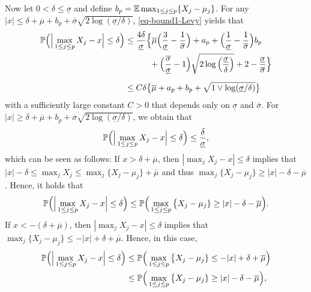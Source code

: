 \documentclass[a4paper,12pt]{article}
\begin{document}
Now let $0 < \delta \le \underline{\sigma}$ and define $b_p = \mathbb{E} \max_{1 \le j \le p} \{X_j - \mu_j\}$. For any $|x| \le \delta + \overline{\mu} + b_p + \overline{\sigma} \sqrt{2\log(\underline{\sigma}/\delta)}$, \eqref{eq-bound1-Levy} yields that 
\begin{align}
\pr \Big( \Big| \max_{1 \le j \le p} X_j - x \Big| \le \delta \Big) 
 & \le \frac{4 \delta}{\underline{\sigma}} \Big\{ \overline{\mu} \Big( \frac{3}{\underline{\sigma}} - \frac{1}{\overline{\sigma}} \Big) + a_p + \Big( \frac{1}{\underline{\sigma}} - \frac{1}{\overline{\sigma}} \Big) b_p \nonumber \\ & \phantom{\le \frac{4 \delta}{\underline{\sigma}} \Big\{} + \Big( \frac{\overline{\sigma}}{\underline{\sigma}} - 1 \Big) \sqrt{2\log\Big(\frac{\underline{\sigma}}{\delta}\Big)} + 2 - \frac{\underline{\sigma}}{\overline{\sigma}} \Big\} \nonumber \\[0.2cm]
 & \le C \delta \big\{ \overline{\mu} + a_p + b_p + \sqrt{1 \vee \log(\underline{\sigma}/\delta)} \big\} \label{eq-bound2-Levy}
\end{align}
with a sufficiently large constant $C > 0$ that depends only on $\underline{\sigma}$ and $\overline{\sigma}$. For $|x| \ge \delta + \overline{\mu} + b_p + \overline{\sigma}\sqrt{2\log(\underline{\sigma}/\delta)}$, we obtain that 
\begin{equation}\label{eq-bound3-Levy}
\mathbb{P} \Big( \Big| \max_{1 \le j \le p} X_j - x \Big| \le \delta \Big) \le \frac{\delta}{\underline{\sigma}}, 
\end{equation}
which can be seen as follows: If $x > \delta + \overline{\mu}$, then $|\max_j X_j - x| \le \delta$ implies that $|x| - \delta \le \max_j X_j \le \max_j \{ X_j - \mu_j \} + \overline{\mu}$ and thus $\max_j \{ X_j - \mu_j \} \ge |x| - \delta - \overline{\mu}$. Hence, it holds that 
\begin{equation}\label{eq-bound3-Levy-prep1}
\mathbb{P} \Big( \Big| \max_{1 \le j \le p} X_j - x \Big| \le \delta \Big) \le \mathbb{P} \Big( \max_{1 \le j \le p} \big\{ X_j - \mu_j \} \ge |x| - \delta - \overline{\mu} \Big). 
\end{equation}
If $x < - (\delta + \overline{\mu})$, then $|\max_j X_j - x| \le \delta$ implies that $\max_j \{ X_j - \mu_j \} \le -|x| + \delta + \overline{\mu}$. Hence, in this case,
\begin{align}
\mathbb{P} \Big( \Big| \max_{1 \le j \le p} X_j - x \Big| \le \delta \Big) 
 & \le \mathbb{P} \Big( \max_{1 \le j \le p} \big\{ X_j - \mu_j \} \le -|x| + \delta + \overline{\mu} \Big) \nonumber \\
 & \le \mathbb{P} \Big( \max_{1 \le j \le p} \big\{ X_j - \mu_j \} \ge |x| - \delta - \overline{\mu} \Big), \label{eq-bound3-Levy-prep2}
\end{align}
\end{document}
